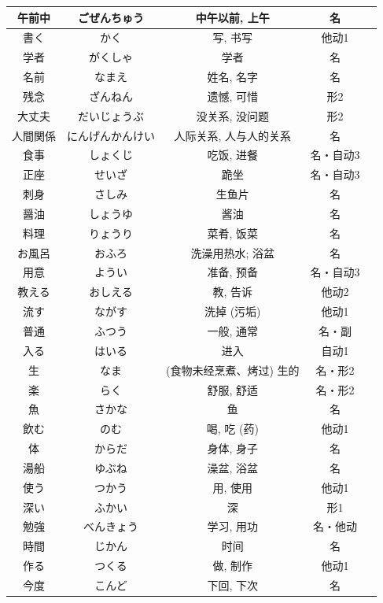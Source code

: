 \begin{longtable}{|c|c|c|c|c|}
午前中 & ごぜんちゅう & 中午以前, 上午 & 名 &  \\ \hline
書く & かく & 写, 书写 & 他动1 &  \\ \hline
学者 & がくしゃ & 学者 & 名 &  \\ \hline
名前 & なまえ & 姓名, 名字 & 名 &  \\ \hline
残念 & ざんねん & 遗憾, 可惜 & 形2 &  \\ \hline
大丈夫 & だいじょうぶ & 没关系, 没问题 & 形2 &  \\ \hline
人間関係 & にんげんかんけい & 人际关系, 人与人的关系 & 名 &  \\ \hline
食事 & しょくじ & 吃饭, 进餐 & 名・自动3 &  \\ \hline
正座 & せいざ & 跪坐 & 名・自动3 &  \\ \hline
刺身 & さしみ & 生鱼片 & 名 &  \\ \hline
醤油 & しょうゆ & 酱油 & 名 &  \\ \hline
料理 & りょうり & 菜肴, 饭菜 & 名 &  \\ \hline
お風呂 & おふろ & 洗澡用热水; 浴盆 & 名 &  \\ \hline
用意 & ようい & 准备, 预备 & 名・自动3 &  \\ \hline
教える & おしえる & 教, 告诉 & 他动2 &  \\ \hline
流す & ながす & 洗掉 (污垢) & 他动1 &  \\ \hline
普通 & ふつう & 一般, 通常 & 名・副 &  \\ \hline
入る & はいる & 进入 & 自动1 &  \\ \hline
生 & なま & (食物未经烹煮、烤过) 生的 & 名・形2 &  \\ \hline
楽 & らく & 舒服, 舒适 & 名・形2 &  \\ \hline
魚 & さかな & 鱼 & 名 &  \\ \hline
飲む & のむ & 喝, 吃 (药) & 他动1 &  \\ \hline
体 & からだ & 身体, 身子 & 名 &  \\ \hline
湯船 & ゆぶね & 澡盆, 浴盆 & 名 &  \\ \hline
使う & つかう & 用, 使用 & 他动1 &  \\ \hline
深い & ふかい & 深 & 形1 &  \\ \hline
勉強 & べんきょう & 学习, 用功 & 名・他动 &  \\ \hline
時間 & じかん & 时间 & 名 &  \\ \hline
作る & つくる & 做, 制作 & 他动1 &  \\ \hline
今度 & こんど & 下回, 下次 & 名 &  \\ \hline

\end{longtable}
